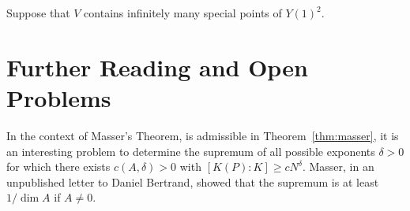 Suppose that $V$ contains infinitely many
special points of $Y(1)^2$.

\section{Further Reading and Open Problems}

In the context of Masser's Theorem, is admissible in
Theorem~\ref{thm:masser}, it is an interesting problem to determine
the supremum of all possible exponents $\delta>0$ for which there
exists $c(A,\delta)>0$ with $[K(P):K]\ge c N^{\delta}$. Masser, in an
unpublished letter to Daniel Bertrand, showed that the supremum is at
least $1/\dim A$ if $A\not=0$. 


